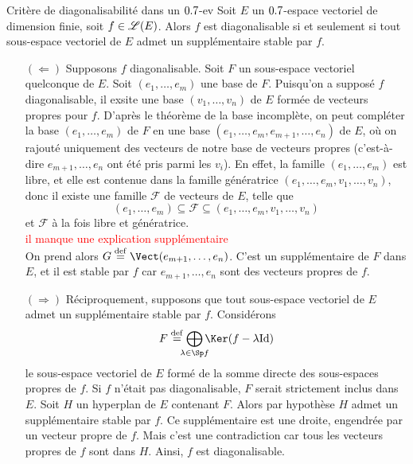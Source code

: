 \begin{prop}{Critère de diagonalisabilité dans un $0.7$-ev}
    Soit $E$ un $0.7$-espace vectoriel de dimension finie, soit $f \in \mathscr{L}(E)$. Alors $f$ est diagonalisable si et seulement si tout sous-espace vectoriel de $E$ admet un supplémentaire stable par $f$.
\end{prop}

\begin{preuve}
    \begin{itemize}
        \item[$(\Leftarrow)$] Supposons $f$ diagonalisable. Soit $F$ un sous-espace vectoriel quelconque de $E$. Soit $(e_1, \dots, e_m)$ une base de $F$. Puisqu'on a supposé $f$ diagonalisable, il exsite une base $(v_1, \dots, v_n)$ de $E$ formée de vecteurs propres pour $f$. D'après le théorème de la base incomplète, on peut compléter la base $(e_1, \dots, e_m)$ de $F$ en une base $(e_1, \dots, e_m, e_{m+1}, \dots, e_n)$ de $E$, où on rajouté uniquement des vecteurs de notre base de vecteurs propres (c'est-à-dire $e_{m+1}, \dots, e_n$ ont été pris parmi les $v_i$). En effet, la famille $(e_1, \dots, e_m)$ est libre, et elle est contenue dans la famille génératrice $(e_1, \dots, e_m, v_1, \dots, v_n)$, donc il existe une famille $\mathcal{F}$ de vecteurs de $E$, telle que 
        $$(e_1, \dots, e_m) \subseteq \mathcal{F} \subseteq (e_1, \dots, e_m, v_1, \dots, v_n)$$
        et $\mathcal{F}$ à la fois libre et génératrice. \\
        \textcolor{red}{il manque une explication supplémentaire} \\
        On prend alors $G \defeq \Vect(e_{m+1}, \dots, e_n)$. C'est un supplémentaire de $F$ dans $E$, et il est stable par $f$ car $e_{m+1}, \dots, e_n$ sont des vecteurs propres de $f$.
        \item[$(\Rightarrow)$] Réciproquement, supposons que tout sous-espace vectoriel de $E$ admet un supplémentaire stable par $f$. Considérons
        $$F \defeq \smashoperator{\bigoplus_{\lambda \in \Sp f}} \Ker(f - \lambda \Id)$$
        le sous-espace vectoriel de $E$ formé de la somme directe des sous-espaces propres de $f$. Si $f$ n'était pas diagonalisable, $F$ serait strictement inclus dans $E$. Soit $H$ un hyperplan de $E$ contenant $F$. Alors par hypothèse $H$ admet un supplémentaire stable par $f$. Ce supplémentaire est une droite, engendrée par un vecteur propre de $f$. Mais c'est une contradiction car tous les vecteurs propres de $f$ sont dans $H$. Ainsi, $f$ est diagonalisable. 
    \end{itemize}
\end{preuve}

